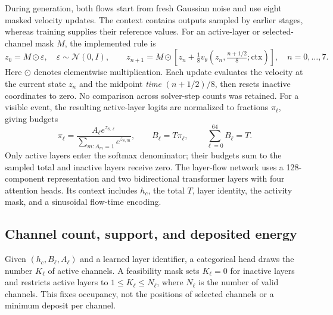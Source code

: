 \documentclass[11pt]{article}
\begin{document}
During generation, both flows start from fresh Gaussian noise and use eight masked velocity updates. The context contains outputs sampled by earlier stages, whereas training supplies their reference values. For an active-layer or selected-channel mask $M$, the implemented rule is
\begin{equation}
 z_0=M\odot\varepsilon,\quad \varepsilon\sim\mathcal N(0,I),\qquad
 z_{n+1}=M\odot\left[z_n+\tfrac18
 v_\theta\!\left(z_n,\tfrac{n+1/2}{8};\mathrm{ctx}\right)\right],
 \quad n=0,\ldots,7.
 \label{eq:flow_steps}
\end{equation}
Here $\odot$ denotes elementwise multiplication. Each update evaluates the velocity at the current state $z_n$ and the midpoint \emph{time} $(n+1/2)/8$, then resets inactive coordinates to zero. No comparison across solver-step counts was retained. For a visible event, the resulting active-layer logits are normalized to fractions $\pi_\ell$, giving budgets
\begin{equation}
 \pi_\ell=\frac{A_\ell e^{z_{8,\ell}}}
 {\sum_{m:A_m=1}e^{z_{8,m}}},\qquad
 B_\ell=T\pi_\ell,\qquad \sum_{\ell=0}^{64}B_\ell=T.
 \label{eq:layer_budget}
\end{equation}
Only active layers enter the softmax denominator; their budgets sum to the sampled total and inactive layers receive zero. The layer-flow network uses a 128-component representation and two bidirectional transformer layers with four attention heads. Its context includes $h_c$, the total $T$, layer identity, the activity mask, and a sinusoidal flow-time encoding.

\subsection{Channel count, support, and deposited energy}

Given $(h_c,B_\ell,A_\ell)$ and a learned layer identifier, a categorical head draws the number $K_\ell$ of active channels. A feasibility mask sets $K_\ell=0$ for inactive layers and restricts active layers to $1\leq K_\ell\leq N_\ell$, where $N_\ell$ is the number of valid channels. This fixes occupancy, not the positions of selected channels or a minimum deposit per channel.
\end{document}
